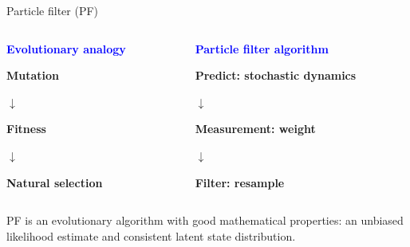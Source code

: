 \documentclass{beamer}
\begin{document}
\begin{frame}{Particle filter (PF)}

  \begin{columns}
    \begin{column}{0.48\linewidth}
      \begin{center}
      {\bf \textcolor{blue}{Evolutionary analogy}}

      \vspace{5mm}
      
      {\bf Mutation}

      $\downarrow$

      {\bf Fitness}

      $\downarrow$

      {\bf Natural selection}
      
      \end{center}
    \end{column}
     \begin{column}{0.48\linewidth}
      \begin{center}
      {\bf \textcolor{blue}{Particle filter algorithm}}

      \vspace{5mm}
      
      {\bf Predict: stochastic dynamics}

      $\downarrow$

      {\bf Measurement: weight}

      $\downarrow$

      {\bf Filter: resample}
      \end{center}
    \end{column}
  \end{columns}

  \vspace{15mm}
  
    \begin{myitemize}
  \item PF is an evolutionary algorithm with good mathematical properties: an unbiased likelihood estimate and consistent latent state distribution.
  \end{myitemize}

\end{frame}
  
\end{document}

